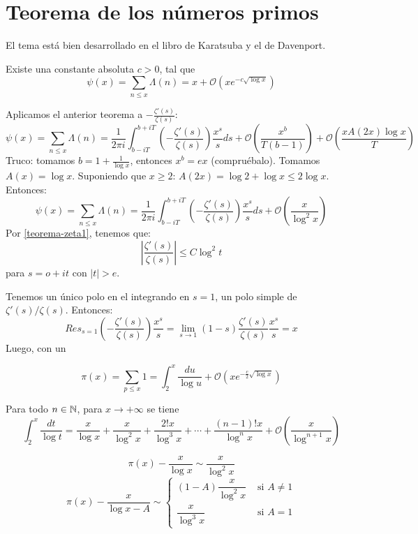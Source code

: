 \documentclass[TAN.tex]{subfiles}
\begin{document}
\section{Teorema de los números primos}
El tema está bien desarrollado en el libro de Karatsuba y el de Davenport.

\begin{teorema}
Existe una constante absoluta $c > 0$, tal que
\[ ψ(x) = \sum_{n≤x} Λ(n) = x + \mathcal{O}\left(xe^{-c\sqrt{\log x}}\right) \]
\end{teorema}
\begin{dem}
Aplicamos el anterior teorema a $-\frac{ζ'(s)}{ζ(s)}$:
\[ ψ(x) = \sum_{n≤x} Λ(n) = \frac{1}{2πi} \int_{b-iT}^{b+iT}\left(-\frac{ζ'(s)}{ζ(s)}\right)\frac{x^s}{s} ds + \mathcal{O}\left(\frac{x^b}{T(b-1)}\right) + \mathcal{O}\left(\frac{xA(2x)\log x}{T}\right) \]
Truco: tomamos $b = 1+\frac{1}{\log x}$, entonces $x^b = ex$ (compruébalo). Tomamos $A(x)=\log x$. Suponiendo que $x ≥ 2$: $A(2x)=\log 2 + \log x ≤ 2\log x$. Entonces:
\[ ψ(x) = \sum_{n≤x} Λ(n) = \frac{1}{2πi} \int_{b-iT}^{b+iT}\left(-\frac{ζ'(s)}{ζ(s)}\right)\frac{x^s}{s} ds + \mathcal{O}\left(\frac{x}{\log^2x}\right) \]
Por \ref{teorema-zeta1}, tenemos que:
\[ \left|\frac{ζ'(s)}{ζ(s)}\right| ≤ C \log^2 t\]
para $s=ο+it$ con $|t|>e$.

Tenemos un único polo en el integrando en $s=1$, un polo simple de $ζ'(s)/ζ(s)$. Entonces:
\[ Res_{s=1} \left(-\frac{ζ'(s)}{ζ(s)}\right)\frac{x^s}{s} = \lim_{s\to1} (1-s)\frac{ζ'(s)}{ζ(s)} \frac{x^s}{s} = x\]
Luego, con un 
\end{dem}

\begin{teorema}
\[ π(x) = \sum_{p≤x} 1 = \int_2^x \frac{du}{\log u} + \mathcal{O}\left(xe^{-\frac{c}{2} \sqrt{\log x}}\right) \]
\end{teorema}

\begin{prop}
Para todo $n \in \mathbb{N}$, para $x \to +∞$ se tiene
\[ \int_2^x \frac{dt}{\log t} = \frac{x}{\log x} + \frac{x}{\log^2 x} + \frac{2!x}{\log^3 x} + \cdots + \frac{(n-1)!x}{\log^n x} + \mathcal{O}\left(\frac{x}{\log^{n+1}x}\right) \]
\end{prop}

\begin{coro}
\[ π(x) - \frac{x}{\log x} \sim \frac{x}{\log^2 x} \]
\[ π(x) - \frac{x}{\log x - A} \sim \begin{cases}
	(1-A)\dfrac{x}{\log^2 x} &\text{ si }A \neq 1\\
	\dfrac{x}{\log^3 x} &\text{ si }A=1
\end{cases}\]
\end{coro}
\end{document}
